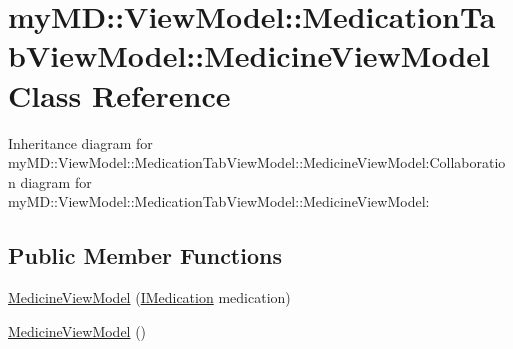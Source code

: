 \hypertarget{classmy_m_d_1_1_view_model_1_1_medication_tab_view_model_1_1_medicine_view_model}{
\section{my\-MD::View\-Model::Medication\-Tab\-View\-Model::Medicine\-View\-Model Class Reference}
\label{d0/d4a/classmy_m_d_1_1_view_model_1_1_medication_tab_view_model_1_1_medicine_view_model}
}
Inheritance diagram for my\-MD::View\-Model::Medication\-Tab\-View\-Model::Medicine\-View\-Model:Collaboration diagram for my\-MD::View\-Model::Medication\-Tab\-View\-Model::Medicine\-View\-Model:\subsection*{Public Member Functions}
\begin{CompactItemize}
\item 
\hypertarget{classmy_m_d_1_1_view_model_1_1_medication_tab_view_model_1_1_medicine_view_model_c28ac122f3bdc38bbadc9562adbe6068}{
\hyperlink{classmy_m_d_1_1_view_model_1_1_medication_tab_view_model_1_1_medicine_view_model_c28ac122f3bdc38bbadc9562adbe6068}{Medicine\-View\-Model} (\hyperlink{interfacemy_m_d_1_1_model_interface_1_1_data_model_interface_1_1_i_medication}{IMedication} medication)}
\label{d0/d4a/classmy_m_d_1_1_view_model_1_1_medication_tab_view_model_1_1_medicine_view_model_c28ac122f3bdc38bbadc9562adbe6068}

\item 
\hypertarget{classmy_m_d_1_1_view_model_1_1_medication_tab_view_model_1_1_medicine_view_model_274b62783d423882d55c3310a86d4e01}{
\hyperlink{classmy_m_d_1_1_view_model_1_1_medication_tab_view_model_1_1_medicine_view_model_274b62783d423882d55c3310a86d4e01}{Medicine\-View\-Model} ()}
\label{d0/d4a/classmy_m_d_1_1_view_model_1_1_medication_tab_view_model_1_1_medicine_view_model_274b62783d423882d55c3310a86d4e01}

\end{CompactItemize}
